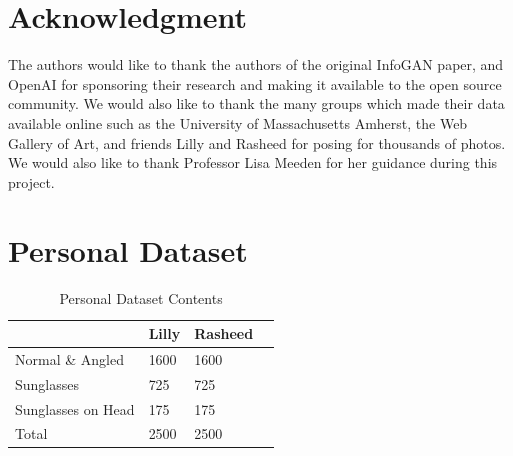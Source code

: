 \documentclass[conference,11pt]{IEEEtran}
\begin{document}
\section*{Acknowledgment}

The authors would like to thank the authors of the original InfoGAN paper, and OpenAI for sponsoring their research and making it available to the open source community. We would also like to thank the many groups which made their data available online such as the University of Massachusetts Amherst, the Web Gallery of Art, and friends Lilly and Rasheed for posing for thousands of photos.  We would also like to thank Professor Lisa Meeden for her guidance during this project. 

\ifCLASSOPTIONcaptionsoff
  \newpage
\fi


{}

\appendices
\section{Personal Dataset}

\begin{table}[ht]
\caption{Personal Dataset Contents}
\centering
    \begin{tabular}{ |p{4cm}||p{1.5cm}|p{1.5cm}|p{3cm}|  }
     \hline
        & Lilly &Rasheed\\
     \hline
     Normal \& Angled & 1600    &1600\\
     Sunglasses& 725 & 725 \\
     Sunglasses on Head & 175 & 175\\
     \hline
     Total    &2500 & 2500\\
     \hline
    \end{tabular}
\end{table}
\end{document}
